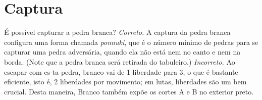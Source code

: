\chapter{Captura}

\problemDiagrams%
  {É possível capturar a pedra branca?}
\answerDiagrams%
  {\emph{Correto.} A captura da pedra branca configura uma forma chamada \emph{ponnuki}, que é o número mínimo de pedras para se capturar uma pedra adversária, quando ela não está nem no canto e nem na borda. (Note que a pedra branca será retirada do tabuleiro.)}%
  {\emph{Incorreto.} Ao escapar com es-ta pedra, branco vai de 1 liberdade para 3, o que é bastante eficiente, isto é, 2 liberdades por movimento; em lutas, liberdades são um bem crucial. Desta maneira, Branco também expõe os cortes A e B no exterior preto.}%
